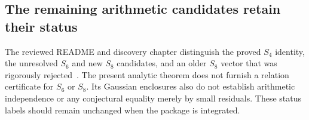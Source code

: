 \subsection{The remaining arithmetic candidates retain their status}
The reviewed README and discovery chapter distinguish the proved $S_4$
identity, the unresolved $S_6$ and new $S_8$ candidates, and an older
$S_8$ vector that was rigorously rejected~\cite{repoStatus}. The
present analytic theorem does not furnish a relation certificate for
$S_6$ or $S_8$. Its Gaussian enclosures also do not establish arithmetic
independence or any conjectural equality merely by small residuals.
These status labels should remain unchanged when the package is
integrated.
